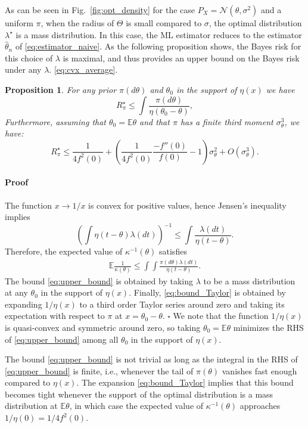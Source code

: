 \documentclass[letterpaper, 11pt]{IEEEtran}      %
\newtheorem{prop}[thm]{\bf {Proposition}}
\newenvironment{proof}{\paragraph*{Proof}}{\hfill$\square$ \newline}
\newcommand{\Ncal}{\mathcal{N}}
\begin{document}
As can be seen in Fig.~\ref{fig:opt_density} for the case $P_X = \Ncal(\theta ,\sigma^2)$ and a uniform $\pi$, when the radius of $\Theta$ is small compared to $\sigma$, the optimal distribution $\lambda^\star$ is a mass distribution. In this case, the ML estimator reduces to the estimator $\hat{\theta}_n$ of \eqref{eq:estimator_naive}. As the following proposition shows, the Bayes risk for this choice of $\lambda$ is maximal, and thus provides an upper bound on the Bayes risk under any $\lambda$. 
 \eqref{eq:cvx_average}. 
\begin{prop}\label{prop:upper_bound}
For any prior $\pi(d\theta)$ and $\theta_0$ in the support of $\eta(x)$ we have
\begin{equation} 
\label{eq:upper_bound}
R_\pi^\star  \leq 
 \int \frac{\pi(d\theta)}{\eta \left( \theta_0 - \theta \right)},
\end{equation}
Furthermore, assuming that $\theta_0 = \mathbb E \theta$ and that $\pi$ has a finite third moment $\sigma_\theta^3$, we have: 
\begin{equation}
\label{eq:bound_Taylor}
R^\star_\pi \leq \frac{1}{4 f^2(0)} + \left(\frac{1}{4 f^2(0)} \frac{-f''(0)}{f(0)} -1 \right) \sigma_\theta^2 + O(\sigma_\theta^3).
\end{equation}
\end{prop}
\begin{proof}
The function $x \rightarrow 1/x$ is convex for positive values, hence Jensen's inequality implies
\[
\left( \int \eta \left( t-\theta\right) \lambda(dt) \right)^{-1}  \leq \int  \frac{ \lambda(dt)}{ \eta \left( t-\theta\right)  }. 
\]
Therefore, the expected value of $\kappa^{-1}(\theta)$ satisfies
\begin{align}
\mathbb E  \frac{1}{\kappa(\theta)}  \leq \int \int \frac{\pi(d\theta) \lambda(dt) }{\eta \left( t - \theta \right)}. \label{eq:upper_bound_proof}
\end{align}
The bound \eqref{eq:upper_bound} is obtained by taking $\lambda$ to be a mass distribution at any $\theta_0$ in the support of $\eta(x)$. Finally, \eqref{eq:bound_Taylor} is obtained by expanding $1/\eta(x)$ to a third order Taylor series around zero
and taking its expectation with respect to $\pi$ at $x=\theta_0-\theta$. 
\end{proof}
We note that the function $1/\eta(x)$ is quasi-convex and symmetric around zero, so taking $\theta_0 = \mathbb E \theta$ minimizes the RHS of \eqref{eq:upper_bound} among all $\theta_0$ in the support of $\eta(x)$.\par
The bound \eqref{eq:upper_bound} is not trivial as long as the integral in the RHS of \eqref{eq:upper_bound} is finite, i.e., whenever the tail of $\pi(\theta)$ vanishes fast enough compared to $\eta(x)$. The expansion \eqref{eq:bound_Taylor} implies that this bound becomes tight whenever the support of the optimal distribution is a mass distribution at $\mathbb E \theta$, in which case the expected value of $\kappa^{-1}(\theta)$ approaches $1/\eta(0) = 1/4f^2(0)$. 
\end{document}

